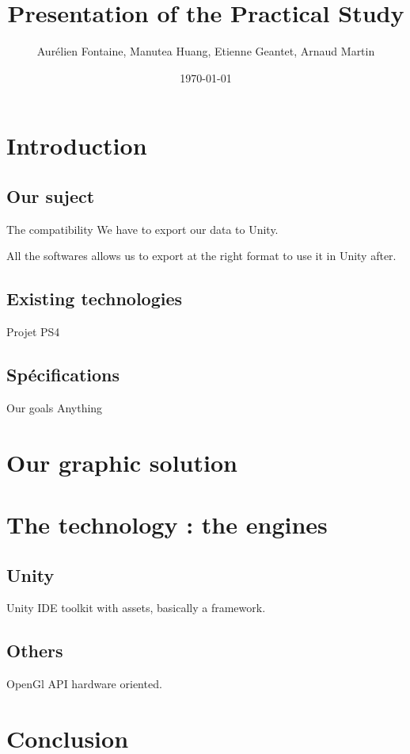\documentclass[a4paper,10pt]{beamer}
\title{Presentation of the Practical Study}
\author[Groupe 3INFO]{Aurélien Fontaine, Manutea Huang, Etienne Geantet, Arnaud Martin}
\institute[INSA de Rennes]{Institut National des Sciences Appliquées de Rennes}
\date{\today}
\begin{document}
	\begin{frame}
		\titlepage
	\end{frame}
	
	\begin{frame}
		\tableofcontents
	\end{frame}
	
	\section{Introduction}
	
		\subsection{Our suject}
	
			\begin{frame}{}
				\begin{block}{The compatibility}
					We have to export our data to Unity.
				\end{block}
				All the softwares allows us to export at the right format to use it in Unity after.
			\end{frame}
			
		\subsection{Existing technologies}
			
			\begin{frame}{}
				Projet PS4
			\end{frame}
		
		\subsection{Spécifications}
		
			\begin{frame}{Our goals}
				Anything
			\end{frame}
	
	\section{Our graphic solution}
	
	\section{The technology : the engines}
	
		\subsection{Unity}
		
			\begin{frame}{Unity}
				IDE toolkit with assets, basically a framework.
			\end{frame}
			
		\subsection{Others}
			
			\begin{frame}{OpenGl}
				API hardware oriented.
			\end{frame}
			
	\section{Conclusion}
	
\end{document}
